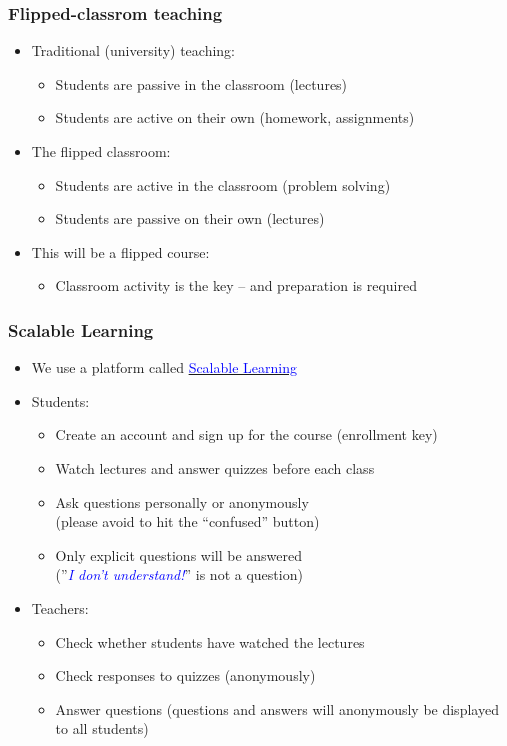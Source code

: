 \documentclass[dvipsnames]{beamer}
\begin{document}
\begin{frame}
\frametitle{Flipped-classrom teaching}
\begin{itemize}
\item Traditional (university) teaching:
\begin{itemize}
\item Students are \alert{passive} in the classroom (lectures)
\item Students are \alert{active} on their own (homework, assignments)
\end{itemize}
\item The flipped classroom:
\begin{itemize}
\item Students are \alert{active} in the classroom (problem solving)
\item Students are \alert{passive} on their own (lectures) %
\end{itemize}
\item This will be a flipped course:
\begin{itemize}
\item Classroom activity is the key -- and preparation is required
\end{itemize}
\end{itemize}
\end{frame}

\begin{frame}
\frametitle{Scalable Learning}
\begin{itemize}
\item We use a platform called \href{http://www.scalable-learning.com/\#/users/login}{\textcolor{blue}{Scalable Learning}}
\item Students:
\begin{itemize}
\item Create an account and sign up for the course (\alert{enrollment key})
\item Watch lectures and answer quizzes before each class
\item Ask questions personally or anonymously \\(please avoid to hit
  the ``confused'' button)
\item Only explicit questions will be answered
  \\(''\emph{\textcolor{blue}{I don't understand!}}'' is not a
  question)
\end{itemize}
\item Teachers:
\begin{itemize}
\item Check whether students have watched the lectures
\item Check responses to quizzes (anonymously)
\item Answer questions (questions and answers will anonymously be
  displayed to all students)
\end{itemize}
\end{itemize}
\end{frame}
\end{document}
